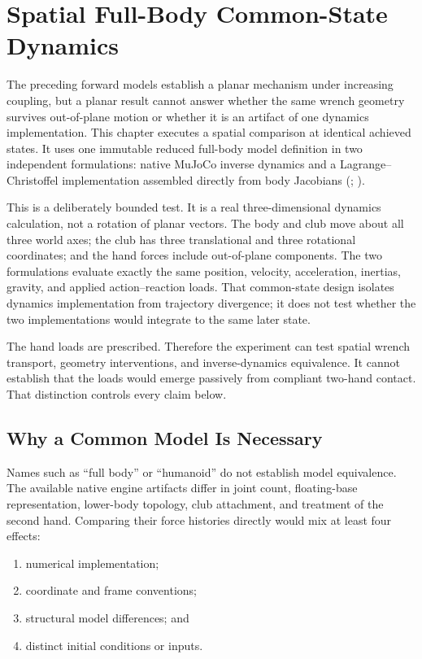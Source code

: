 \documentclass[
  letterpaper,
]{report}
\providecommand{\tightlist}{%
  \setlength{\itemsep}{0pt}\setlength{\parskip}{0pt}}
\begin{document}
\chapter{Spatial Full-Body Common-State
Dynamics}\label{sec-spatial-full-body}

The preceding forward models establish a planar mechanism under
increasing coupling, but a planar result cannot answer whether the same
wrench geometry survives out-of-plane motion or whether it is an
artifact of one dynamics implementation. This chapter executes a spatial
comparison at identical achieved states. It uses one immutable reduced
full-body model definition in two independent formulations: native
MuJoCo inverse dynamics and a Lagrange--Christoffel implementation
assembled directly from body Jacobians
(;
).

This is a deliberately bounded test. It is a real three-dimensional
dynamics calculation, not a rotation of planar vectors. The body and
club move about all three world axes; the club has three translational
and three rotational coordinates; and the hand forces include
out-of-plane components. The two formulations evaluate exactly the same
position, velocity, acceleration, inertias, gravity, and applied
action--reaction loads. That common-state design isolates dynamics
implementation from trajectory divergence; it does not test whether the
two implementations would integrate to the same later state.

The hand loads are prescribed. Therefore the experiment can test spatial
wrench transport, geometry interventions, and inverse-dynamics
equivalence. It cannot establish that the loads would emerge passively
from compliant two-hand contact. That distinction controls every claim
below.

\section{Why a Common Model Is
Necessary}\label{sec-spatial-common-model-need}

Names such as ``full body'' or ``humanoid'' do not establish model
equivalence. The available native engine artifacts differ in joint
count, floating-base representation, lower-body topology, club
attachment, and treatment of the second hand. Comparing their force
histories directly would mix at least four effects:

\begin{enumerate}
\def\labelenumi{\arabic{enumi}.}
\tightlist
\item
  numerical implementation;
\item
  coordinate and frame conventions;
\item
  structural model differences; and
\item
  distinct initial conditions or inputs.
\end{enumerate}
\end{document}
